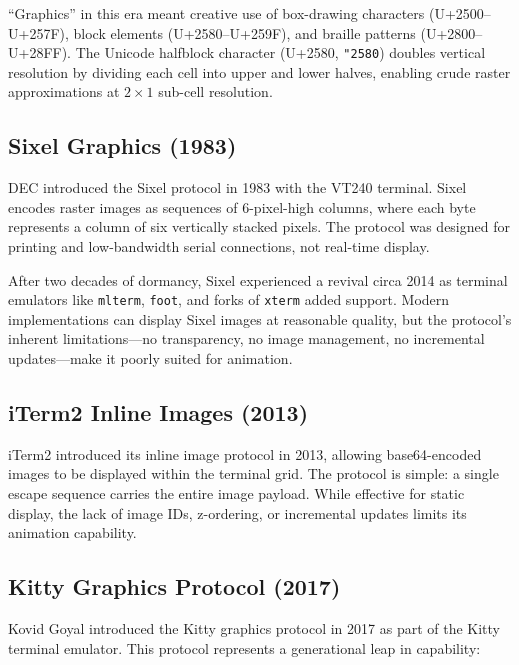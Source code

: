 \documentclass[11pt, a4paper, twocolumn]{article}
\begin{document}
``Graphics'' in this era meant creative use of box-drawing characters (U+2500--U+257F), block elements (U+2580--U+259F), and braille patterns (U+2800--U+28FF).
The Unicode halfblock character (U+2580, \texttt{\char"2580}) doubles vertical resolution by dividing each cell into upper and lower halves, enabling crude raster approximations at $2 \times 1$ sub-cell resolution.

\subsection{Sixel Graphics (1983)}

DEC introduced the Sixel protocol in 1983 with the VT240 terminal.
Sixel encodes raster images as sequences of 6-pixel-high columns, where each byte represents a column of six vertically stacked pixels.
The protocol was designed for printing and low-bandwidth serial connections, not real-time display.

After two decades of dormancy, Sixel experienced a revival circa 2014 as terminal emulators like \texttt{mlterm}, \texttt{foot}, and forks of \texttt{xterm} added support.
Modern implementations can display Sixel images at reasonable quality, but the protocol's inherent limitations---no transparency, no image management, no incremental updates---make it poorly suited for animation.

\subsection{iTerm2 Inline Images (2013)}

iTerm2 introduced its inline image protocol in 2013, allowing base64-encoded images to be displayed within the terminal grid.
The protocol is simple: a single escape sequence carries the entire image payload.
While effective for static display, the lack of image IDs, z-ordering, or incremental updates limits its animation capability.

\subsection{Kitty Graphics Protocol (2017)}

Kovid Goyal introduced the Kitty graphics protocol in 2017 as part of the Kitty terminal emulator.
This protocol represents a generational leap in capability:
\end{document}
